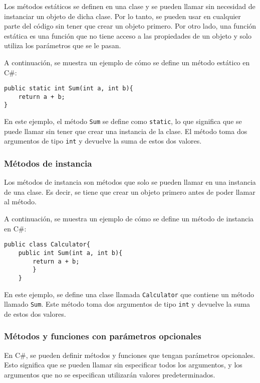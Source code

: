 \documentclass[executivepaper]{article}
\begin{document}
Los métodos estáticos se definen en una clase y se pueden llamar sin necesidad de instanciar un objeto de dicha clase. Por lo tanto, se pueden usar en cualquier parte del código sin tener que crear un objeto primero. Por otro lado, una función estática es una función que no tiene acceso a las propiedades de un objeto y solo utiliza los parámetros que se le pasan.

A continuación, se muestra un ejemplo de cómo se define un método estático en C\#:

\begin{lstlisting}
public static int Sum(int a, int b){
    return a + b;
}
\end{lstlisting}

En este ejemplo, el método \texttt{Sum} se define como \texttt{static}, lo que significa que se puede llamar sin tener que crear una instancia de la clase. El método toma dos argumentos de tipo \texttt{int} y devuelve la suma de estos dos valores.

\subsubsection*{Métodos de instancia}

Los métodos de instancia son métodos que solo se pueden llamar en una instancia de una clase. Es decir, se tiene que crear un objeto primero antes de poder llamar al método.

A continuación, se muestra un ejemplo de cómo se define un método de instancia en C\#:

\begin{lstlisting}
public class Calculator{
    public int Sum(int a, int b){
        return a + b;
        }
    }
\end{lstlisting}

En este ejemplo, se define una clase llamada \texttt{Calculator} que contiene un método llamado \texttt{Sum}. Este método toma dos argumentos de tipo \texttt{int} y devuelve la suma de estos dos valores.

\subsubsection*{Métodos y funciones con parámetros opcionales}

En C\#, se pueden definir métodos y funciones que tengan parámetros opcionales. Esto significa que se pueden llamar sin especificar todos los argumentos, y los argumentos que no se especifican utilizarán valores predeterminados.
\end{document}
